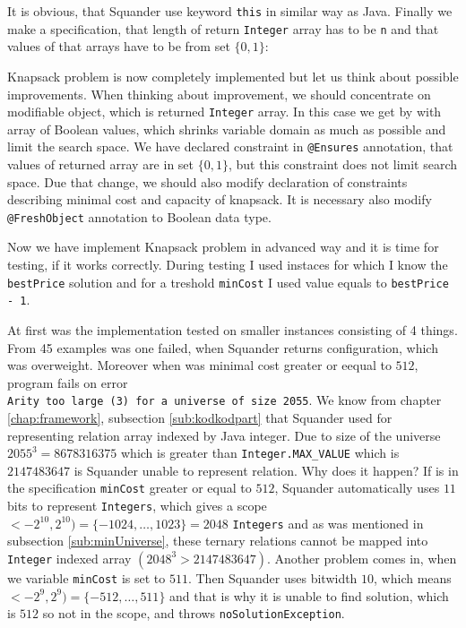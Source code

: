 \documentclass[11pt,twoside,a4paper]{book}
\begin{document}


It is obvious, that Squander use keyword \verb|this| in similar way as Java.
Finally we make a specification, that length of return \verb|Integer| array has
to be \verb|n| and that values of that arrays have to be from set $\{0, 1\}$:



Knapsack problem is now completely implemented but let us think about possible
improvements. When thinking about improvement, we should concentrate on
modifiable object, which is returned \verb|Integer| array. In this case we get
by with array of Boolean values, which shrinks variable domain as much as possible
and limit the search space. We have declared constraint in \verb|@Ensures|
annotation, that values of returned array are in set $\{0, 1\}$, but this
constraint does not limit search space. Due that change, we should also modify
declaration of constraints describing minimal cost and capacity of knapsack. It
is necessary also modify \verb|@FreshObject| annotation to Boolean data type.
\newpage


Now we have implement Knapsack problem in advanced way and it is time for
testing, if it works correctly. During testing I used instaces for which I
know the \verb|bestPrice| solution and for a treshold \verb|minCost| I used
value equals to \verb|bestPrice - 1|.

At first was the implementation tested on smaller instances consisting of 4
things. From 45 examples was one failed, when Squander returns configuration,
which was overweight. Moreover when was minimal cost greater or eequal to
$512$, program fails on error\\ \verb|Arity too large (3) for a universe of size 2055|. We know
from chapter \ref{chap:framework}, subsection \ref{sub:kodkodpart} that Squander
used for representing relation array indexed by Java integer. Due to size of
the universe $2055^3 = 8678316375$ which is greater than
\verb|Integer.MAX_VALUE| which is $2147483647$ is Squander unable to represent
relation. Why does it happen? If is in the specification \verb|minCost|
greater or equal to $512$, Squander automatically uses $11$ bits to
represent \verb|Integers|, which gives a scope $<-2^{10},2^{10}) =
\{-1024,\ldots,1023\} = 2048$ \verb|Integers| and as was mentioned in subsection
\ref{sub:minUniverse}, these ternary relations cannot be mapped into
\verb|Integer| indexed array $(2048^3 > 2147483647)$. Another problem comes in,
when we variable \verb|minCost| is set to $511$. Then Squander uses bitwidth $10$, which means $<-2^9,2^9) = \{-512,\ldots,511\}$ and that is why it is unable to find solution, which is $512$ so not in the scope, and throws \verb|noSolutionException|.
\end{document}
